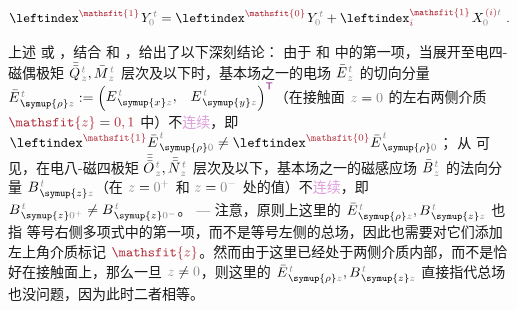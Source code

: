 \begin{align} \label{eq:1BC}
	\leftindex^{\textcolor{Maroon}{\mathsfit{1}}} \;\! Y^{\;\!\mathcolor{gray}{t}}_{\mathcolor{gray}{0}} = \leftindex^{\textcolor{Maroon}{\mathsfit{0}}} \;\! Y^{\;\!\mathcolor{gray}{t}}_{\mathcolor{gray}{0}} + \leftindex^{\textcolor{Maroon}{\mathsfit{1}}}_{\textcolor{Maroon}{i}} \;\! X^{\;\!\textcolor{Maroon}{(i)}\mathcolor{gray}{t}}_{\mathcolor{gray}{0}} ~.
\end{align}

上述  或 ，结合  和 ，给出了以下深刻结论：{\one} 由于  和  中的第一项，当展开至\textcolor{NavyBlue}{电四-磁偶}极矩 $\bar{\bar{Q}}^{\;\!\mathcolor{gray}{t}}_{\;\!\mathcolor{gray}{z}}, \bar{M}^{\;\!\mathcolor{gray}{t}}_{\;\!\mathcolor{gray}{z}}$ 层次及以下时，\textcolor{NavyBlue}{基本场}之一的电场 $\bar{E}^{\;\!\mathcolor{gray}{t}}_{\;\!\mathcolor{gray}{z}}$ 的切向分量 $\bar{E}^{\;\!\mathcolor{gray}{t}}_{\;\! \symup{\rho} \mathcolor{gray}{z}} := \begin{pmatrix} E^{\;\!\mathcolor{gray}{t}}_{\;\! \symup{x} \mathcolor{gray}{z}}, & E^{\;\!\mathcolor{gray}{t}}_{\;\! \symup{y} \mathcolor{gray}{z}} \end{pmatrix}^{\mathsf{\textcolor{Plum}{T}}}$（在接触面 $\mathcolor{gray}{z \mathcolor{black}{=} 0}$ 的左右两侧介质 $\textcolor{Maroon}{\mathsfit{z}} = \textcolor{Maroon}{0,1}$ 中）不\textcolor{Plum}{连续}，即 $\leftindex^{\textcolor{Maroon}{\mathsfit{1}}} {\bar{E}}^{\;\!\mathcolor{gray}{t}}_{\;\! \symup{\rho} \mathcolor{gray}{0}} \neq \leftindex^{\textcolor{Maroon}{\mathsfit{0}}} {\bar{E}}^{\;\!\mathcolor{gray}{t}}_{\;\! \symup{\rho} \mathcolor{gray}{0}}$；{\two} 从  可见，在\textcolor{NavyBlue}{电八-磁四}极矩 $\bar{\bar{\bar{O}}}^{\;\!\mathcolor{gray}{t}}_{\;\!\mathcolor{gray}{z}}, \bar{\bar{N}}^{\;\!\mathcolor{gray}{t}}_{\;\!\mathcolor{gray}{z}}$ 层次及以下，\textcolor{NavyBlue}{基本场}之一的磁感应场 $\bar{B}^{\;\!\mathcolor{gray}{t}}_{\;\!\mathcolor{gray}{z}}$ 的法向分量 $B^{\;\!\mathcolor{gray}{t}}_{\;\! \symup{z} \mathcolor{gray}{z}}$（在 $\mathcolor{gray}{z \mathcolor{black}{=} 0^+}$ 和 $\mathcolor{gray}{z \mathcolor{black}{=} 0^-}$ 处的值）不\textcolor{Plum}{连续}，即 $B^{\;\!\mathcolor{gray}{t}}_{\;\! \symup{z} \mathcolor{gray}{0^+}} \neq B^{\;\!\mathcolor{gray}{t}}_{\;\! \symup{z} \mathcolor{gray}{0^-}}$。 ---  注意，原则上这里的 $\bar{E}^{\;\!\mathcolor{gray}{t}}_{\;\! \symup{\rho} \mathcolor{gray}{z}},B^{\;\!\mathcolor{gray}{t}}_{\;\! \symup{z} \mathcolor{gray}{z}}$ 也指  等号右侧多项式中的第一项，而不是等号左侧的总场，因此也需要对它们添加左上角介质标记 $\textcolor{Maroon}{\mathsfit{z}}$。然而由于这里已经处于两侧介质内部，而不是恰好在接触面上，那么一旦 $\mathcolor{gray}{z} \neq \mathcolor{gray}{0}$，则这里的 $\bar{E}^{\;\!\mathcolor{gray}{t}}_{\;\! \symup{\rho} \mathcolor{gray}{z}},B^{\;\!\mathcolor{gray}{t}}_{\;\! \symup{z} \mathcolor{gray}{z}}$ 直接指代总场  也没问题，因为此时二者相等。


